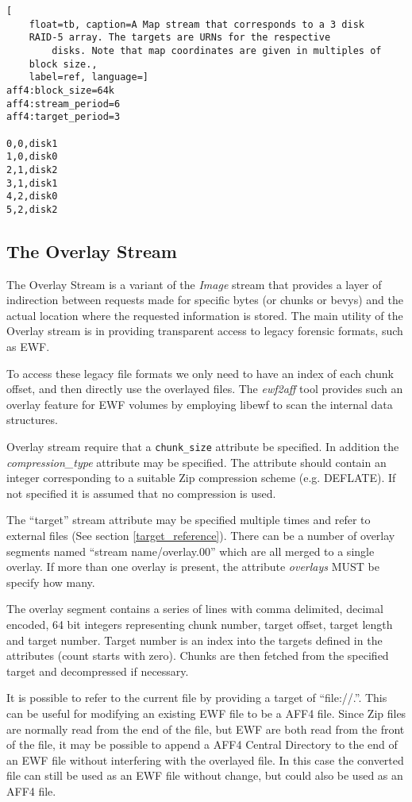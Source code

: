 \documentclass[10pt, conference]{IEEEtran}
\begin{document}
\begin{lstlisting}[
	float=tb, caption=A Map stream that corresponds to a 3 disk
	RAID-5 array. The targets are URNs for the respective
        disks. Note that map coordinates are given in multiples of 
	block size.,
	label=ref, language=]
aff4:block_size=64k 
aff4:stream_period=6 
aff4:target_period=3

0,0,disk1
1,0,disk0
2,1,disk2
3,1,disk1
4,2,disk0
5,2,disk2
\end{lstlisting}

\subsection{The Overlay Stream}
The Overlay Stream is a variant of the {\em Image} stream that
provides a layer of indirection between requests made for specific
bytes (or chunks or bevys) and the actual location where the requested
information is stored. The main utility of the Overlay stream is in
providing transparent access to legacy forensic formats, such as EWF.

To access these legacy file formats we only need to have an index of
each chunk offset, and then directly use the overlayed files.  The {\em
ewf2aff} tool provides such an overlay feature for EWF volumes by
employing libewf to scan the internal data structures.

Overlay stream require that a \texttt{chunk\_size} attribute be specified. In
addition the {\em compression\_type} attribute may be specified. The
attribute should contain an integer corresponding to a suitable Zip
compression scheme (e.g. DEFLATE). If not specified it is assumed
that no compression is used.

The ``target'' stream attribute may be specified multiple times and
refer to external files (See section \ref{target_reference}). There
can be a number of overlay segments named ``stream name/overlay.00''
which are all merged to a single overlay. If more than one overlay is
present, the attribute {\em overlays} MUST be specify how many.

The overlay segment contains a series of lines with comma delimited,
decimal encoded, 64 bit integers representing chunk number, target
offset, target length and target number. Target number is an index
into the targets defined in the attributes (count starts with zero).
Chunks are then fetched from the specified target and decompressed if
necessary.

It is possible to refer to the current file by providing a target of
``file://.''. This can be useful for modifying an existing EWF file to
be a AFF4 file. Since Zip files are normally read from the end of the
file, but EWF are both read from the front of the file, it may
be possible to append a AFF4 Central Directory to the end of an EWF file without
interfering with the overlayed file. In this case the converted file
can still be used as an EWF file without change, but could also be
used as an AFF4 file.
\end{document}
